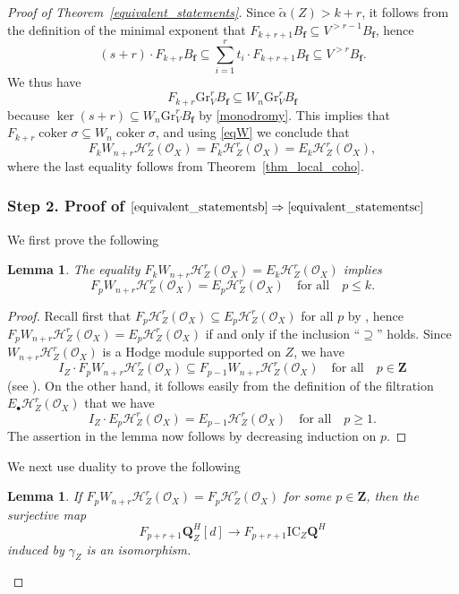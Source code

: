 \documentclass[JEP,XML,SOM,Unicode]{cedram}
\newcommand{\sbullet}{{\scriptscriptstyle\bullet}}
\theoremstyle{plain}
\newtheorem{lem}[thm]{Lemma}
\theoremstyle{definition}
\newcommand\Z{{\mathbf Z}}
\newcommand\Q{{\mathbf Q}}
\newcommand\cH{\mathcal{H}}
\newcommand\cO{\mathcal{O}}
\newcommand\cH{\mathcal{H}}
\newcommand\cO{\mathcal{O}}
\newcommand\bff{{\boldsymbol f}}
\newcommand\gr{\mathrm{Gr}}
\DeclareMathOperator{\coker}{coker}
\begin{document}
\begin{proof}[Proof of Theorem~\ref{equivalent_statements}]
Since $\widetilde\alpha(Z)>k+r$, it follows from the definition of the minimal exponent that
$F_{k+r+1}B_\bff\subseteq V^{>r-1}B_\bff$, hence
\[
(s+r)\cdot F_{k+r}B_\bff \subseteq \sum^r_{i=1} t_i \cdot F_{k+r+1} B_\bff \subseteq V^{>r} B_\bff.
\]
We thus have
\begin{equation}\label{eq:ab2}
F_{k+r}\gr^r_V B_\bff \subseteq W_n\gr^r_V B_\bff
\end{equation}
because $\ker(s+r)\subseteq W_n\gr^r_VB_\bff$ by \eqref{monodromy}.
This implies that $F_{k+r}\coker\sigma\subseteq W_n\coker \sigma$, and using \eqref{eqW}
we conclude that
\[F_kW_{n+r}\cH^r_Z(\cO_X)=F_k\cH_Z^r(\cO_X)=E_k\cH^r_Z(\cO_X),\]
where the last equality follows from Theorem~\ref{thm_local_coho}.

\subsubsection*{Step 2. Proof of $\eqref{equivalent_statementsb}\Rightarrow\eqref{equivalent_statementsc}$}
We first prove the following

\begin{lem}\label{lem:6}
The equality $F_k W_{n+r}\cH^r_Z(\cO_X)=E_k \cH^r_Z(\cO_X)$ implies
\[
F_p W_{n+r}\cH^r_Z(\cO_X)=E_p \cH^r_Z(\cO_X) \quad \text{for all} \quad p\leq k.
\]
\end{lem}

\begin{proof}
Recall first that $F_p\cH^r_Z(\cO_X)\subseteq E_p\cH^r_Z(\cO_X)$ for all $p$ by \cite[Prop.\,3.4]{MP1},
hence $F_p W_{n+r}\cH^r_Z(\cO_X)=E_p \cH^r_Z(\cO_X)$ if and only if the inclusion ``$\supseteq$'' holds.
Since $W_{n+r}\cH^r_Z(\cO_X)$ is a Hodge module supported on $Z$, we have
\[
I_Z \cdot F_p W_{n+r}\cH^r_Z(\cO_X) \subseteq F_{p-1} W_{n+r}\cH^r_Z(\cO_X)\quad\text{for all}\quad p\in\Z
\]
(see \cite[Lem.\,3.2.6]{Saito_MHP}).
On the other hand, it follows easily from the definition of the filtration $E_{\sbullet}\cH_Z^r(\cO_X)$ that we have
\[
I_Z\cdot E_p\cH^r_Z(\cO_X)=E_{p-1}\cH^r_Z(\cO_X)\quad\text{for all}\quad p\geq 1.
\]
The assertion in the lemma now follows by decreasing induction on $p$.
\end{proof}

We next use duality to prove the following

\begin{lem}\label{lem:dualfw}
If $F_pW_{n+r}\cH^r_Z(\cO_X)=F_p \cH^r_Z(\cO_X)$ for some $p\in \Z$, then the surjective map
\[
F_{p+r+1}\Q_Z^H[d] \to F_{p+r+1}\mathrm{IC}_Z\Q^H
\]
induced by $\gamma_Z$ is an isomorphism.
\end{lem}


\end{proof}
\end{document}
